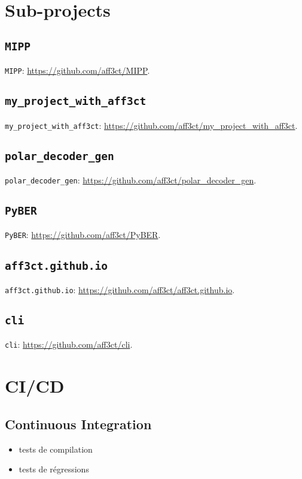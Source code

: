 \section{Sub-projects}

\subsection{\texttt{MIPP}}

\texttt{MIPP}: \url{https://github.com/aff3ct/MIPP}.

\subsection{\texttt{my\_project\_with\_aff3ct}}

\texttt{my\_project\_with\_aff3ct}: \url{https://github.com/aff3ct/my_project_with_aff3ct}.

\subsection{\texttt{polar\_decoder\_gen}}

\texttt{polar\_decoder\_gen}: \url{https://github.com/aff3ct/polar_decoder_gen}.

\subsection{\texttt{PyBER}}

\texttt{PyBER}: \url{https://github.com/aff3ct/PyBER}.

\subsection{\texttt{aff3ct.github.io}}

\texttt{aff3ct.github.io}: \url{https://github.com/aff3ct/aff3ct.github.io}.

\subsection{\texttt{cli}}

\texttt{cli}: \url{https://github.com/aff3ct/cli}.

\section{CI/CD}

\subsection{Continuous Integration}
\begin{itemize}
  \item tests de compilation
  \item tests de régressions
\end{itemize}

